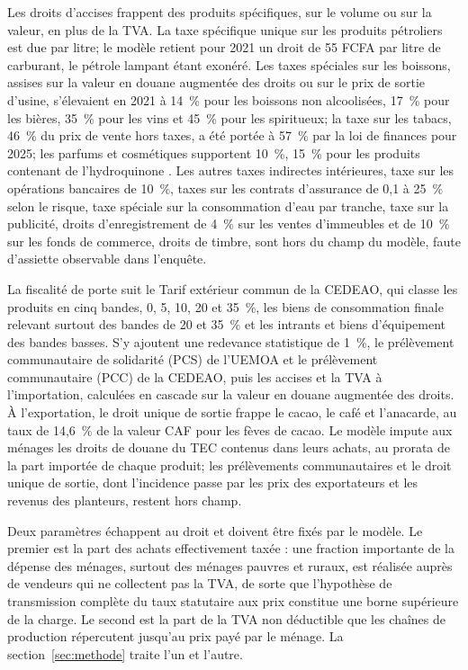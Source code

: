 \documentclass[11pt,a4paper]{article}
\begin{document}
Les droits d'accises frappent des produits spécifiques, sur le volume ou sur la
valeur, en plus de la TVA. La taxe spécifique unique sur les produits pétroliers
est due par litre; le modèle retient pour 2021 un droit de 55 FCFA par litre de
carburant, le pétrole lampant étant exonéré. Les taxes spéciales sur les
boissons, assises sur la valeur en douane augmentée des droits ou sur le prix de
sortie d'usine, s'élevaient en 2021 à 14~\% pour les boissons non alcoolisées, 17~\%
pour les bières, 35~\% pour les vins et 45~\% pour les spiritueux; la taxe sur
les tabacs, 46~\% du prix de vente hors taxes, a été portée à 57~\% par la loi
de finances pour 2025; les parfums et cosmétiques supportent 10~\%, 15~\% pour
les produits contenant de l'hydroquinone \citep{dgi2025impots}. Les autres
taxes indirectes intérieures, taxe sur les opérations bancaires de 10~\%, taxes
sur les contrats d'assurance de 0,1 à 25~\% selon le risque, taxe spéciale sur
la consommation d'eau par tranche, taxe sur la publicité, droits
d'enregistrement de 4~\% sur les ventes d'immeubles et de 10~\% sur les fonds de
commerce, droits de timbre, sont hors du champ du modèle, faute d'assiette
observable dans l'enquête.

La fiscalité de porte suit le Tarif extérieur commun de la CEDEAO, qui classe
les produits en cinq bandes, 0, 5, 10, 20 et 35~\%, les biens de consommation
finale relevant surtout des bandes de 20 et 35~\% et les intrants et biens
d'équipement des bandes basses. S'y ajoutent une redevance statistique de 1~\%,
le prélèvement communautaire de solidarité (PCS) de l'UEMOA et le prélèvement
communautaire (PCC) de la CEDEAO, puis les accises et la TVA à l'importation, calculées
en cascade sur la valeur en douane augmentée des droits. À l'exportation, le
droit unique de sortie frappe le cacao, le café et l'anacarde, au taux de
14,6~\% de la valeur CAF pour les fèves de cacao. Le modèle impute aux ménages
les droits de douane du TEC contenus dans leurs achats, au prorata de la part
importée de chaque produit; les prélèvements communautaires et le droit unique
de sortie, dont l'incidence passe par les prix des exportateurs et les revenus
des planteurs, restent hors champ.

Deux paramètres échappent au droit et doivent être fixés par le modèle. Le
premier est la part des achats effectivement taxée : une fraction importante de
la dépense des ménages, surtout des ménages pauvres et ruraux, est réalisée
auprès de vendeurs qui ne collectent pas la TVA, de sorte que l'hypothèse de
transmission complète du taux statutaire aux prix constitue une borne
supérieure de la charge. Le second est la part de la TVA non déductible que les
chaînes de production répercutent jusqu'au prix payé par le ménage. La
section~\ref{sec:methode} traite l'un et l'autre.
\end{document}
